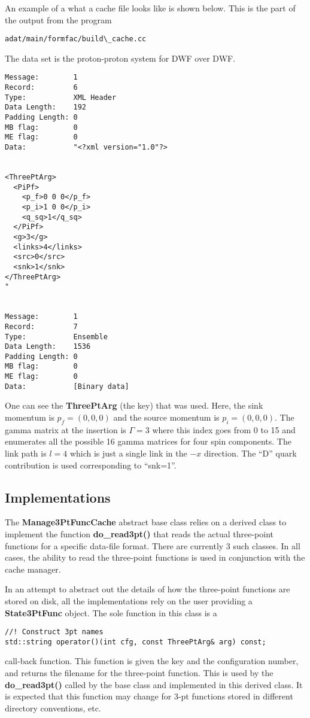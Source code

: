 \documentclass[11pt]{article}
\begin{document}
An example of a what a cache file looks like is shown below. This is the
part of the output from the program
\begin{verbatim}
adat/main/formfac/build\_cache.cc
\end{verbatim}
The data set is the proton-proton system for DWF over DWF.
\begin{verbatim}
Message:        1
Record:         6
Type:           XML Header
Data Length:    192
Padding Length: 0
MB flag:        0
ME flag:        0
Data:           "<?xml version="1.0"?>


<ThreePtArg>
  <PiPf>
    <p_f>0 0 0</p_f>
    <p_i>1 0 0</p_i>
    <q_sq>1</q_sq>
  </PiPf>
  <g>3</g>
  <links>4</links>
  <src>0</src>
  <snk>1</snk>
</ThreePtArg>
" 


Message:        1
Record:         7
Type:           Ensemble
Data Length:    1536
Padding Length: 0
MB flag:        0
ME flag:        0
Data:           [Binary data]
\end{verbatim}
%
One can see the {\bf ThreePtArg} (the key) that was used. Here, the
sink momentum is $p_f=(0,0,0)$ and the source momentum is
$p_i=(0,0,0)$. The gamma matrix at the insertion is $\Gamma=3$ where
this index goes from 0 to 15 and enumerates all the possible 16 gamma
matrices for four spin components. The link path is $l=4$ which is
just a single link in the $-x$ direction. The ``D'' quark contribution
is used corresponding to ``snk=1''.

\subsection{Implementations}

The {\bf Manage3PtFuncCache} abstract base class relies on a derived
class to implement the function {\bf do\_read3pt()} that reads the
actual three-point functions for a specific data-file format. There
are currently 3 such classes. In all cases, the ability to read the
three-point functions is used in conjunction with the cache manager.

In an attempt to abstract out the details of how the three-point functions
are stored on disk, all the implementations rely on the user providing
a {\bf State3PtFunc} object. The sole function in this class is a
\begin{verbatim}
//! Construct 3pt names
std::string operator()(int cfg, const ThreePtArg& arg) const;
\end{verbatim}
call-back function. This function is given the key and the
configuration number, and returns the filename for the three-point
function. This is used by the {\bf do\_read3pt()} called by the base
class and implemented in this derived class. It is expected that this
function may change for 3-pt functions stored in different directory
conventions, etc.
\end{document}
